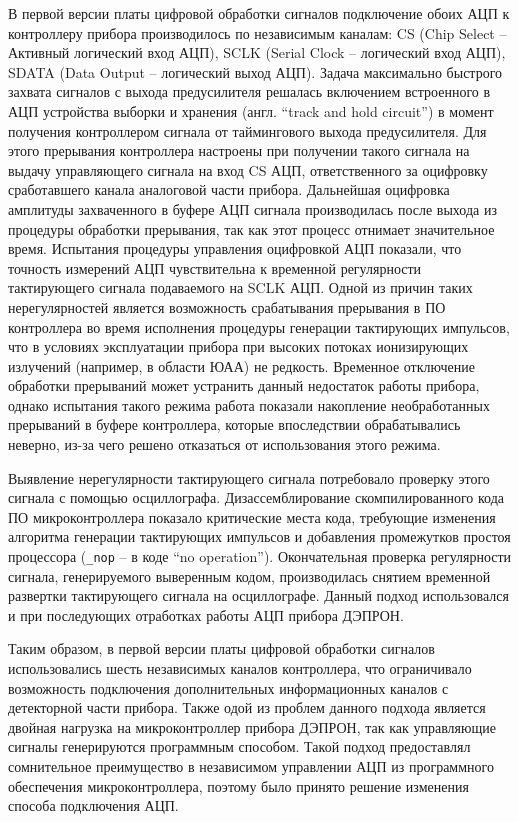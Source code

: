 В первой версии платы цифровой обработки сигналов подключение обоих АЦП к контроллеру прибора производилось по независимым каналам: CS (Chip Select -- Активный логический вход АЦП), SCLK (Serial Clock -- логический вход АЦП), SDATA (Data Output -- логический выход АЦП). Задача максимально быстрого захвата сигналов с выхода предусилителя решалась включением встроенного в АЦП устройства выборки и хранения (англ. ``track and hold circuit'') в момент получения контроллером сигнала от таймингового выхода предусилителя. Для этого прерывания контроллера настроены при получении такого сигнала на выдачу управляющего сигнала на вход CS АЦП, ответственного за оцифровку сработавшего канала аналоговой части прибора. Дальнейшая оцифровка амплитуды захваченного в буфере АЦП сигнала производилась после выхода из процедуры обработки прерывания, так как этот процесс отнимает значительное время. Испытания процедуры управления оцифровкой АЦП показали, что точность измерений АЦП чувствительна к временной регулярности тактирующего сигнала подаваемого на SCLK АЦП. Одной из причин таких нерегулярностей является возможность срабатывания прерывания в ПО контроллера во время исполнения процедуры генерации тактирующих импульсов, что в условиях эксплуатации прибора при высоких потоках ионизирующих излучений (например, в области ЮАА) не редкость. Временное отключение обработки прерываний может устранить данный недостаток работы прибора, однако испытания такого режима работа показали накопление необработанных прерываний в буфере контроллера, которые впоследствии обрабатывались неверно, из-за чего решено отказаться от использования этого режима.



Выявление нерегулярности тактирующего сигнала потребовало проверку этого сигнала с помощью осциллографа. Дизассемблирование скомпилированного кода ПО микроконтроллера показало критические места кода, требующие изменения алгоритма генерации тактирующих импульсов и добавления промежутков простоя процессора (\texttt{\_nop} -- в коде ``no operation''). Окончательная проверка регулярности сигнала, генерируемого выверенным кодом, производилась снятием временной развертки тактирующего сигнала  на осциллографе. Данный подход использовался и при последующих отработках работы АЦП прибора ДЭПРОН.


Таким образом, в первой версии платы цифровой обработки сигналов использовались шесть независимых каналов контроллера, что ограничивало возможность подключения дополнительных информационных каналов с детекторной части прибора. Также одой из проблем данного подхода является двойная нагрузка на микроконтроллер прибора ДЭПРОН, так как управляющие сигналы генерируются программным способом. Такой подход предоставлял сомнительное преимущество в независимом управлении АЦП из программного обеспечения микроконтроллера, поэтому было принято решение изменения способа подключения АЦП.


